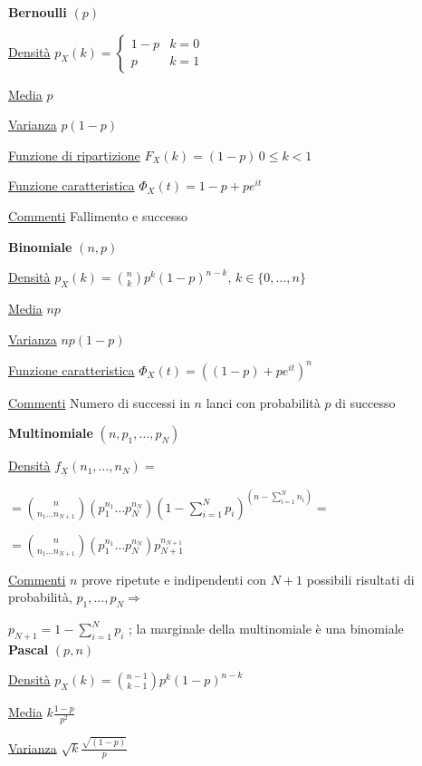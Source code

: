 \documentclass[openany]{book} %
\begin{document}
\begin{multicols}{2}

\textbf{Bernoulli} $(p)$

\underline{Densità} $p_X(k) = \begin {cases}1-p & k =0\\ p & k=1\end {cases}$

\underline{Media} $p$

\underline{Varianza} $p(1-p)$

\underline{Funzione di ripartizione} $F_X(k)=(1-p)\, 0\leq k <1 $

\underline{Funzione caratteristica} $\Phi_X(t)= 1-p+pe^{it}$

\underline{Commenti} Fallimento e successo

\columnbreak

\textbf{Binomiale} $(n,p)$  

\underline{Densità} $p_X(k) = \binom {n}{k}p^k(1-p)^{n-k},\,k \in \{0,\dots,n\}$

\underline{Media} $np$

\underline{Varianza} $np(1-p)$

\underline{Funzione caratteristica} $\Phi_X(t)=((1-p)+pe^{it})^n$

\underline{Commenti} Numero di successi in $n$ lanci con probabilità $p$ di successo

\columnbreak

\textbf{Multinomiale} $(n,p_1,\dots,p_N)$

\underline{Densità} $f_{\underline {X}}(n_1,\dots,n_N)=$

$=\binom {n}{n_1 \dots n_{N+1}}\left(p_1^{n_1}\dots p_N^{n_N}\right)\left(1-\sum_{i=1}^N p_i\right)^{\left(n-\sum_{i=1}^N n_i\right)}=$

$=\binom {n}{n_1 \dots n_{N+1}}\left(p_1^{n_1}\dots p_N^{n_N}\right)p_{N+1}^{n_{N+1}}$

\underline{Commenti} $n$ prove ripetute e indipendenti con $N+1$ possibili risultati di probabilità, \quad $p_1,\dots,p_N \Rightarrow$

$p_{N+1}=1-\sum_{i=1}^Np_i$ ; la marginale della multinomiale è una binomiale
\\

\textbf{Pascal} $(p,n)$

\underline{Densità} $p_X(k) = \binom {n-1}{k-1}p^k(1-p)^{n-k}$

\underline{Media} $k\frac{1-p}{p^2}$

\underline{Varianza} $\sqrt{k}\frac{\sqrt{(1-p)}}{p}$


\end{multicols}
\end{document}
